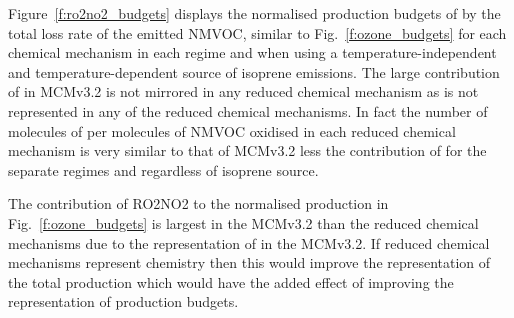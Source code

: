 Figure~\ref{f:ro2no2_budgets} displays the normalised production budgets of  by the total loss rate of the emitted NMVOC, similar to Fig.~\ref{f:ozone_budgets} for each chemical mechanism in each  regime and when using a temperature-independent and temperature-dependent source of isoprene emissions.
The large contribution of  in MCMv3.2 is not mirrored in any reduced chemical mechanism as  is not represented in any of the reduced chemical mechanisms.
In fact the number of molecules of  per molecules of NMVOC oxidised in each reduced chemical mechanism is very similar to that of MCMv3.2 less the contribution of  for the separate  regimes and regardless of isoprene source.

The contribution of RO2NO2 to the normalised  production in Fig.~\ref{f:ozone_budgets} is largest in the MCMv3.2 than the reduced chemical mechanisms due to the representation of  in the MCMv3.2.
If reduced chemical mechanisms represent  chemistry then this would improve the representation of the total  production which would have the added effect of improving the representation of  production budgets.

